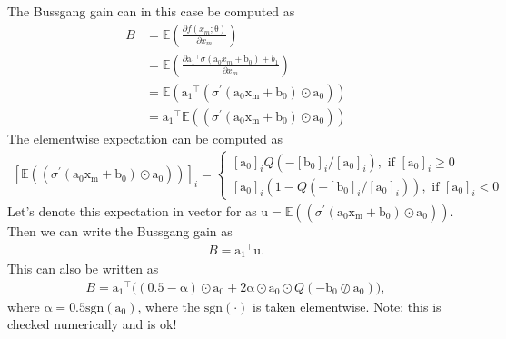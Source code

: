 \documentclass[12pt]{article}
\newcommand{\vect}[1]{\boldsymbol{\mathrm{#1}}}
\newcommand{\note}[1]{{\color{blue} Note: {#1}}}
\newcommand{\expt}[1]{\mathbb{E}\left(#1\right)}
\theoremstyle{remark}
\begin{document}
The Bussgang gain can in this case be computed as
\begin{align}
	B &= \expt{\frac{\partial f(x_m; \vect{\theta})}{\partial x_m}}\\
	&= \expt{\frac{\partial \vect{a_1}^{\intercal}\sigma(\vect{a_0}x_m + \vect{b_0}) + b_1 }{\partial x_m}}\\
	&= \expt{\vect{a_1}^{\intercal} \left(\sigma^{\prime}(\vect{a_0 x_m +b_0}) \odot \vect{a_0}\right)}\\
	&= \vect{a_1}^{\intercal} \expt{\left(\sigma^{\prime}(\vect{a_0 x_m +b_0}) \odot \vect{a_0}\right)}
\end{align}
The elementwise expectation can be computed as
\begin{align}
	\left[\expt{\left(\sigma^{\prime}(\vect{a_0 x_m +b_0}) \odot \vect{a_0}\right)}\right]_i = \begin{cases}
		\left[\vect{a_0}\right]_i  Q\left(-\left[\vect{b_0}\right]_i / \left[\vect{a_0}\right]_i\right), \text{ if } \left[\vect{a_0}\right]_i \geq 0 \\
		\left[\vect{a_0}\right]_i \left(1 -  Q\left(-\left[\vect{b_0}\right]_i / \left[\vect{a_0}\right]_i\right)\right), \text{ if } \left[\vect{a_0}\right]_i < 0
	\end{cases}
\end{align}
Let's denote this expectation in vector for as $\vect{u}=\expt{\left(\sigma^{\prime}(\vect{a_0 x_m +b_0}) \odot \vect{a_0}\right)}$. Then we can write the Bussgang gain as
\begin{align}
	B = \vect{a_1}^{\intercal}\vect{u}.
\end{align}
This can also be written as 
\begin{align}
	B = \vect{a_1}^{\intercal} \big((0.5 - \vect{\alpha}) \odot \vect{a_0} + 2\vect{\alpha}\odot\vect{a_0}\odot Q\left(-\vect{b_0} \oslash \vect{a_0}\right)\big),
\end{align}
where $\vect{\alpha} = 0.5\mathrm{sgn}(\vect{a_0})$, where the $\mathrm{sgn}(\cdot)$ is taken elementwise.
\note{this is checked numerically and is ok!}
\end{document}
